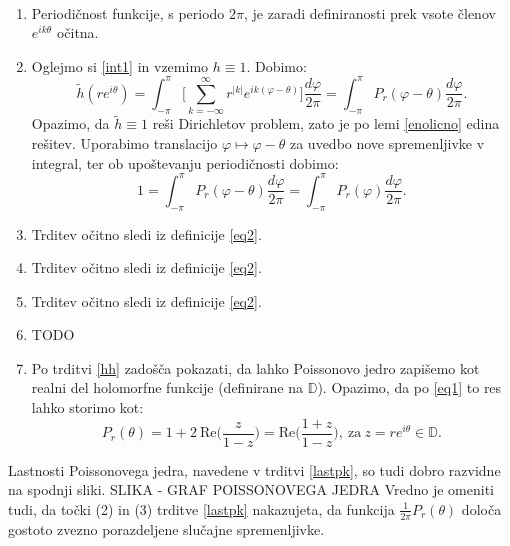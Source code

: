 \documentclass[mat1]{fmfdelo}
\begin{document}
    \begin{dokaz}
        $ $
        \begin{enumerate}
            \item Periodičnost funkcije, s periodo $2\pi$, je zaradi definiranosti prek vsote členov $e^{ik\theta}$ očitna. 
            \item Oglejmo si \ref{int1} in vzemimo $h \equiv 1$. Dobimo: 
            $$
                \widetilde{h}(r e^{i \theta}) = \int_{-\pi}^{\pi}{\bigg[\sum_{k=-\infty}^{\infty}{r^{|k|} e^{ik(\varphi - \theta)}}\bigg] \frac{d \varphi}{2 \pi}} = \int_{-\pi}^{\pi}{P_r(\varphi - \theta)\frac{d \varphi}{2 \pi}}. 
            $$
            Opazimo, da $\widetilde{h} \equiv 1$ reši Dirichletov problem, zato je po lemi \ref{enolicno} edina rešitev. Uporabimo translacijo $\varphi \mapsto \varphi - \theta$ za uvedbo nove spremenljivke v integral, ter ob upoštevanju periodičnosti dobimo:
            $$
                1 = \int_{-\pi}^{\pi}{P_r(\varphi - \theta)\frac{d \varphi}{2 \pi}} = \int_{-\pi}^{\pi}{P_r(\varphi)\frac{d \varphi}{2 \pi}}.
            $$
            \item Trditev očitno sledi iz definicije \ref{eq2}. 
            \item Trditev očitno sledi iz definicije \ref{eq2}. 
            \item Trditev očitno sledi iz definicije \ref{eq2}. 
            \item TODO 
            \item Po trditvi \ref{hh} zadošča pokazati, da lahko Poissonovo jedro zapišemo kot realni del holomorfne funkcije (definirane na $\mathbb{D}$). Opazimo, da po \ref{eq1} to res lahko storimo kot:
            $$
                P_r(\theta) = 1 + 2~\text{Re}\bigg(\frac{z}{1-z}\bigg) = \text{Re}\bigg(\frac{1+z}{1-z}\bigg),~\text{za}~z= re^{i\theta} \in \mathbb{D}.
            $$
        \end{enumerate}
    \end{dokaz}
    \begin{opomba}
        Lastnosti Poissonovega jedra, navedene v trditvi \ref{lastpk}, so tudi dobro razvidne na spodnji sliki. 
        \newline
        SLIKA - GRAF POISSONOVEGA JEDRA
        \newline
        Vredno je omeniti tudi, da točki (2) in (3) trditve \ref{lastpk} nakazujeta, da funkcija $\frac{1}{2 \pi} P_r(\theta)$ določa gostoto zvezno porazdeljene slučajne spremenljivke.
    \end{opomba}
\end{document}
